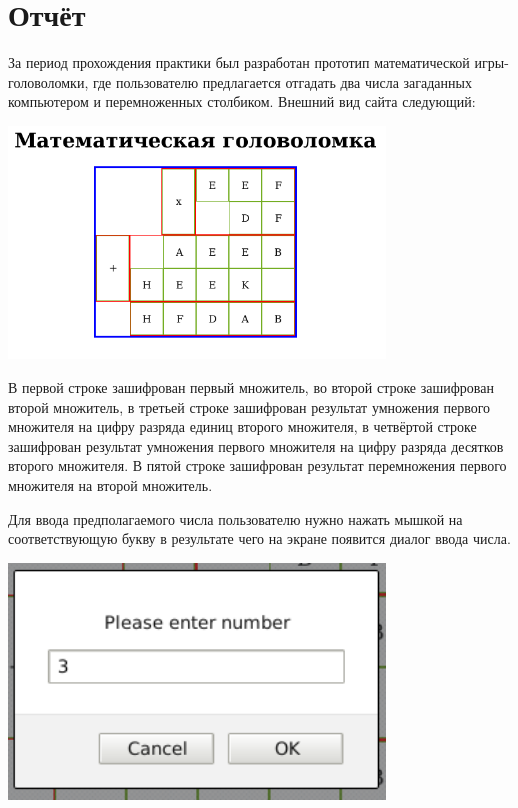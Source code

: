 \section{Отчёт}

За период прохождения практики был разработан прототип математической игры-головоломки, где пользователю предлагается отгадать два числа загаданных компьютером и перемноженных столбиком. Внешний вид сайта следующий:

\begin{center} 
  \includegraphics[width = 10cm]{img/image01.png}
\end{center}

В первой строке зашифрован первый множитель, во второй строке зашифрован второй множитель, в третьей строке зашифрован результат умножения первого множителя на цифру разряда единиц второго множителя, в четвёртой строке зашифрован результат умножения первого множителя на цифру разряда десятков второго множителя. В пятой строке зашифрован результат перемножения первого множителя на второй множитель.

Для ввода предполагаемого числа пользователю нужно нажать мышкой на соответствующую букву в результате чего на экране появится диалог ввода числа. 

\begin{center} 
  \includegraphics[width = 10cm]{img/image02.png}
\end{center}

